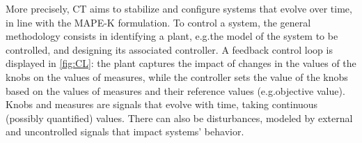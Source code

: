 \documentclass[runningheads]{llncs}
\makeatletter
\newenvironment{textlist}{\begin{enumerate*}[label=(\emph{\roman*})]}{\end{enumerate*}}
\newcommand{\eg}[1][\@ ]{e.g.{#1}}
\newcommand{\measure}[1][]{y\ifx#1\relax\else^{#1}\fi}
\newcommand{\knob}[1][]{u\ifx#1\relax\else^{#1}\fi}
\newcommand{\plant}[1][]{\Psi\ifx#1\relax\else^{#1}\fi}
\newcommand{\controller}[1][]{\mathcal{C}\ifx#1\relax\else^{#1}\fi}
\newcommand{\setpoint}[2][]{#2[{%
      \ifthenelse{\equal{#1}{}}{}{#1,}%
      \mathit{ref}%
  }]%
}
\makeatother
\begin{document}
More precisely, CT aims to stabilize and configure systems that evolve over time, in line with the MAPE-K formulation. 
To control a system, the general methodology consists in identifying a plant, \eg the model of the system to be controlled, and designing its associated controller.
%
%
%
A feedback control loop is displayed in \cref{fig:CL}: the plant captures the impact of changes in the values of the knobs on the values of measures, while the controller sets the value of the knobs based on the values of measures and their reference values (\eg objective value).
Knobs and measures are signals that evolve with time, taking continuous (possibly quantified) values.
There can also be disturbances, modeled by external and uncontrolled signals that impact systems' behavior.

\end{document}

